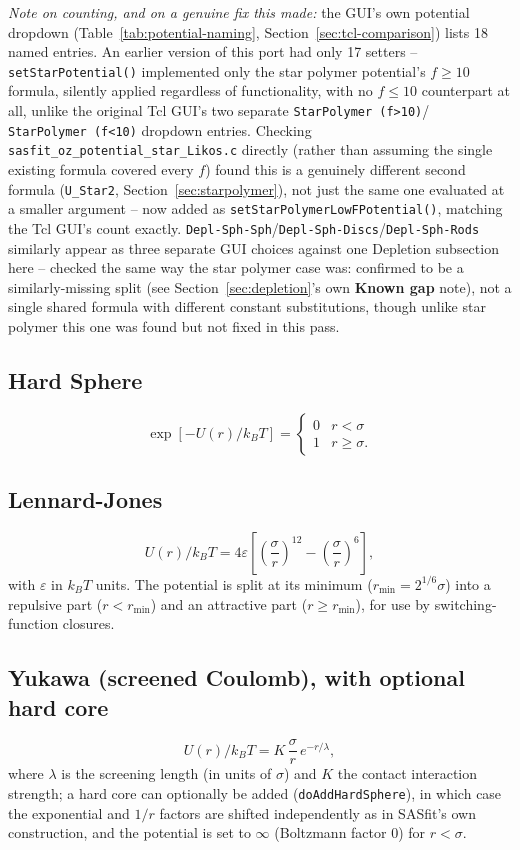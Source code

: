 \documentclass[11pt,a4paper]{article}
\newcommand{\code}[1]{\texttt{#1}}
\begin{document}
\emph{Note on counting, and on a genuine fix this made:} the GUI's own
potential dropdown (Table~\ref{tab:potential-naming},
Section~\ref{sec:tcl-comparison}) lists 18 named entries. An earlier version
of this port had only 17 setters -- \code{setStarPotential()} implemented
only the star polymer potential's $f\ge10$ formula, silently applied
regardless of functionality, with no $f\le10$ counterpart at all,
unlike the original Tcl GUI's two separate \code{StarPolymer (f>10)}/
\code{StarPolymer (f<10)} dropdown entries. Checking
\code{sasfit\_oz\_potential\_star\_Likos.c} directly (rather than assuming
the single existing formula covered every $f$) found this is a genuinely
different second formula (\code{U\_Star2}, Section~\ref{sec:starpolymer}),
not just the same one evaluated at a smaller argument -- now added as
\code{setStarPolymerLowFPotential()}, matching the Tcl GUI's count exactly.
\code{Depl-Sph-Sph}/\code{Depl-Sph-Discs}/\code{Depl-Sph-Rods} similarly
appear as three separate GUI choices against one Depletion subsection here
-- checked the same way the star polymer case was: confirmed to be a
similarly-missing split (see Section~\ref{sec:depletion}'s own
\textbf{Known gap} note), not a single shared formula with different
constant substitutions, though unlike star polymer this one was found but
not fixed in this pass.

\subsection{Hard Sphere}
\begin{equation}
  \exp[-U(r)/k_BT] = \begin{cases} 0 & r<\sigma \\ 1 & r\ge\sigma. \end{cases}
\end{equation}

\subsection{Lennard-Jones}
\begin{equation}
  U(r)/k_BT = 4\varepsilon\left[\left(\frac{\sigma}{r}\right)^{12}-\left(\frac{\sigma}{r}\right)^{6}\right],
\end{equation}
with $\varepsilon$ in $k_BT$ units. The potential is split at its minimum
($r_{\min}=2^{1/6}\sigma$) into a repulsive part ($r<r_{\min}$) and an
attractive part ($r\ge r_{\min}$), for use by switching-function closures.

\subsection{Yukawa (screened Coulomb), with optional hard core}
\begin{equation}
  U(r)/k_BT = K\,\frac{\sigma}{r}\,e^{-r/\lambda},
\end{equation}
where $\lambda$ is the screening length (in units of $\sigma$) and $K$ the
contact interaction strength; a hard core can optionally be added
(\code{doAddHardSphere}), in which case the exponential and $1/r$ factors are
shifted independently as in SASfit's own construction, and the potential is
set to $\infty$ (Boltzmann factor 0) for $r<\sigma$.
\end{document}
